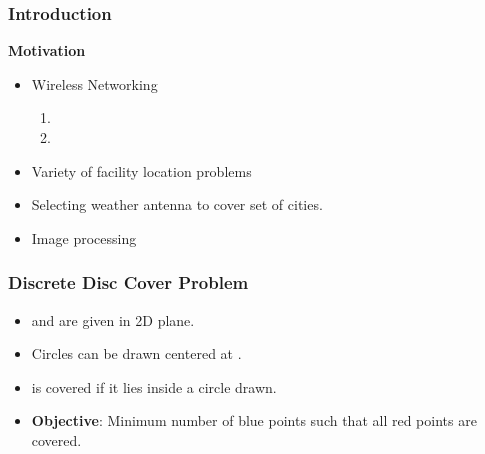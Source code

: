 \documentclass[blue]{beamer}
\begin{document}
\begin{frame}
 \frametitle{Introduction}
 {\color{red}\textbf{Motivation}}
 
 \begin{itemize}
  \item{ Wireless Networking}
    \begin{enumerate}
     \item {\color {blue}{setting wireless gateways}}
     \item {\color {blue}{selecting wireless gateways}}
    \end{enumerate}
  \item Variety of facility location problems
  \item Selecting weather antenna to cover set of cities.
  \item Image processing 
\end{itemize}

\end{frame}

\begin{frame}
 \frametitle{Discrete Disc Cover Problem}
 {} 
 \begin{itemize}
  \item {\color{red}{Red points}} and {\color{blue}{Blue points}} are given in 2D plane.
  \item Circles can be drawn centered at {\color{blue}{blue points}}.
  \item {\color{red}{Red point}} is covered if it lies inside a circle drawn.
  \item {\color{blue}\textbf{Objective}}: Minimum number of blue points such that all red points are covered.
 \end{itemize}

\end{frame}
\end{document}
